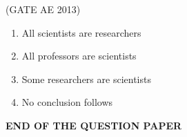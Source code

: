 \documentclass[journal,12pt,onecolumn]{IEEEtran}
\theoremstyle{remark}
\begin{document}
\begin{flushleft}
\begin{enumerate}
\hfill(GATE AE 2013)

\begin{multicols}{2}
\begin{enumerate}
\item All scientists are researchers
\item All professors are scientists
\item Some researchers are scientists
\item No conclusion follows
\end{enumerate}
\end{multicols}

\begin{center}
\textbf{END OF THE QUESTION PAPER}
\end{center}

\end{enumerate}
\end{flushleft}
\end{document}
